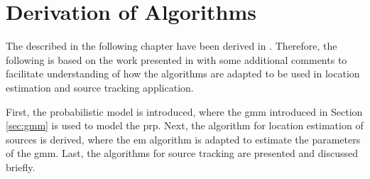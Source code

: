 \chapter{Derivation of Algorithms}
\label{chap:algorithms}

The described in the following chapter have been derived in \cite{Schwartz2014}. Therefore, the following is based on the work presented in \cite{Schwartz2014} with some additional comments to facilitate understanding of how the algorithms are adapted to be used in location estimation and source tracking application.


First, the probabilistic model is introduced, where the \gls{gmm} introduced in Section \ref{sec:gmm} is used to model the \gls{prp}. Next, the algorithm for location estimation of sources is derived, where the \gls{em} algorithm is adapted to estimate the parameters of the \gls{gmm}. Last, the algorithms for source tracking are presented and discussed briefly.







